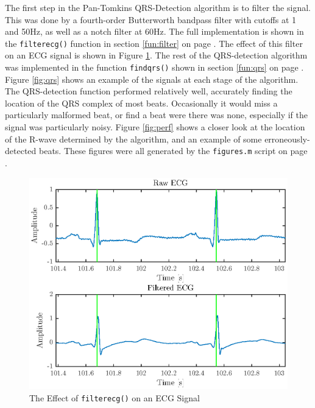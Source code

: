 \documentclass[titlepage,12pt,letter]{article}
\newcommand{\rpref}[1]{\ref{#1} on page \pageref{#1}}
\begin{document}
The first step in the Pan-Tomkins QRS-Detection algorithm is to filter the
signal.  This was done by a fourth-order Butterworth bandpass filter with
cutoffs at 1 and 50Hz, as well as a notch filter at 60Hz.  The full
implementation is shown in the \verb`filterecg()` function in section
\rpref{fun:filter}.  The effect of this filter on an ECG signal is shown in
Figure \ref{fig:filter}.  The rest of the QRS-detection algorithm was
implemented in the function \verb`findqrs()` shown in section \rpref{fun:qrs}.
Figure \ref{fig:qrs} shows an example of the signals at each stage of the
algorithm.  The QRS-detection function performed relatively well, accurately
finding the location of the QRS complex of most beats.  Occasionally it would
miss a particularly malformed beat, or find a beat were there was none,
especially if the signal was particularly noisy.  Figure \ref{fig:perf} shows a
closer look at the location of the R-wave determined by the algorithm, and an
example of some erroneously-detected beats.  These figures were all generated by
the \verb`figures.m` script on page \pageref{scr:fig}.  

\begin{figure}[hbtp]
    \centering
    \includegraphics[height=0.42\textheight]{../figures/figures_02}
    \caption{The Effect of \texttt{filterecg()} on an ECG Signal}
    \label{fig:filter}
\end{figure}
\end{document}
